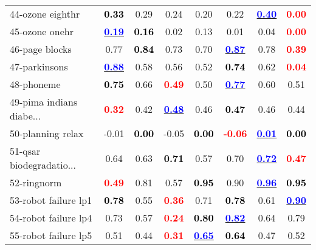 \begin{table}[h]
\begin{center}
\begin{tabular}{lc|c|c|c|c|c|c}
44-ozone eighthr & \textcolor{black}{\textbf{  0.33}} &   0.29 &   0.24 &   0.20 &   0.22 & \underline{\textcolor{blue}{\textbf{  0.40}}} & \textcolor{red}{\textbf{  0.00}} \\
45-ozone onehr & \underline{\textcolor{blue}{\textbf{  0.19}}} & \textcolor{black}{\textbf{  0.16}} &   0.02 &   0.13 &   0.01 &   0.04 & \textcolor{red}{\textbf{  0.00}} \\
46-page blocks &   0.77 & \textcolor{black}{\textbf{  0.84}} &   0.73 &   0.70 & \underline{\textcolor{blue}{\textbf{  0.87}}} &   0.78 & \textcolor{red}{\textbf{  0.39}} \\
47-parkinsons & \underline{\textcolor{blue}{\textbf{  0.88}}} &   0.58 &   0.56 &   0.52 & \textcolor{black}{\textbf{  0.74}} &   0.62 & \textcolor{red}{\textbf{  0.04}} \\
48-phoneme & \textcolor{black}{\textbf{  0.75}} &   0.66 & \textcolor{red}{\textbf{  0.49}} &   0.50 & \underline{\textcolor{blue}{\textbf{  0.77}}} &   0.60 &   0.51 \\ \hline
49-pima indians diabe... & \textcolor{red}{\textbf{  0.32}} &   0.42 & \underline{\textcolor{blue}{\textbf{  0.48}}} &   0.46 & \textcolor{black}{\textbf{  0.47}} &   0.46 &   0.44 \\
50-planning relax &  -0.01 & \textcolor{black}{\textbf{  0.00}} &  -0.05 & \textcolor{black}{\textbf{  0.00}} & \textcolor{red}{\textbf{ -0.06}} & \underline{\textcolor{blue}{\textbf{  0.01}}} & \textcolor{black}{\textbf{  0.00}} \\
51-qsar biodegradatio... &   0.64 &   0.63 & \textcolor{black}{\textbf{  0.71}} &   0.57 &   0.70 & \underline{\textcolor{blue}{\textbf{  0.72}}} & \textcolor{red}{\textbf{  0.47}} \\
52-ringnorm & \textcolor{red}{\textbf{  0.49}} &   0.81 &   0.57 & \textcolor{black}{\textbf{  0.95}} &   0.90 & \underline{\textcolor{blue}{\textbf{  0.96}}} & \textcolor{black}{\textbf{  0.95}} \\
53-robot failure lp1 & \textcolor{black}{\textbf{  0.78}} &   0.55 & \textcolor{red}{\textbf{  0.36}} &   0.71 & \textcolor{black}{\textbf{  0.78}} &   0.61 & \underline{\textcolor{blue}{\textbf{  0.90}}} \\ \hline
54-robot failure lp4 &   0.73 &   0.57 & \textcolor{red}{\textbf{  0.24}} & \textcolor{black}{\textbf{  0.80}} & \underline{\textcolor{blue}{\textbf{  0.82}}} &   0.64 &   0.79 \\
55-robot failure lp5 &   0.51 &   0.44 & \textcolor{red}{\textbf{  0.31}} & \underline{\textcolor{blue}{\textbf{  0.65}}} & \textcolor{black}{\textbf{  0.64}} &   0.47 &   0.52 \\

\end{tabular}
\end{center}
\end{table}
